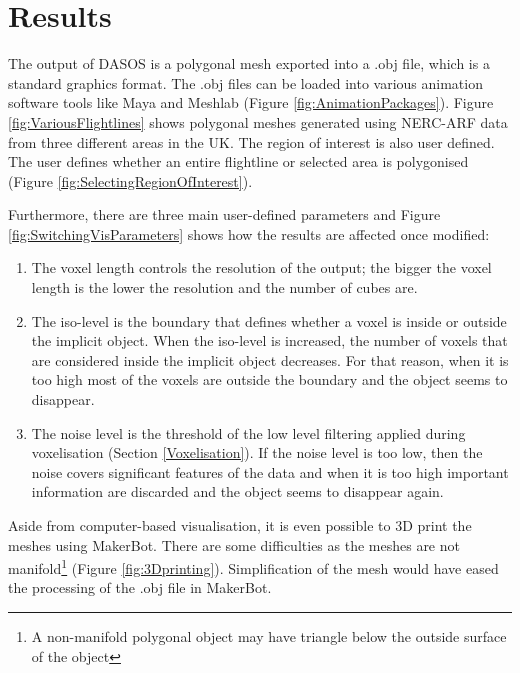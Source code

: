 \documentclass{subfiles}
\begin{document}
\section{Results}\label{sec:MCResults}

\par The output of DASOS is a polygonal mesh exported into a .obj file, which is a standard graphics format. The .obj files can be loaded into various animation software tools like Maya and Meshlab (Figure \ref{fig:AnimationPackages}). Figure \ref{fig:VariousFlightlines} shows polygonal meshes generated using NERC-ARF data from three different areas in the UK.  The region of interest is also user defined. The user defines whether an entire flightline or selected area is polygonised (Figure \ref{fig:SelectingRegionOfInterest}). 

\par Furthermore, there are three main user-defined parameters and Figure \ref{fig:SwitchingVisParameters} shows how the results are affected once modified:
\begin{enumerate}
	\item The voxel length controls the resolution of the output; the bigger the voxel length is the lower the resolution and the number of cubes are.
	\item The iso-level is the boundary that defines whether a voxel is inside or outside the implicit object. When the iso-level is increased, the number of voxels that are considered inside the implicit object decreases. For that reason, when it is too high most of the voxels are outside the boundary and the object seems to disappear.
	\item The noise level is the threshold of the low level filtering applied during voxelisation (Section \ref{Voxelisation}). If the noise level is too low, then the noise covers significant features of the data and when it is too high important information are discarded and the object seems to disappear again.
\end{enumerate}

 
\par Aside from computer-based visualisation, it is even possible to 3D print the meshes using MakerBot.  There are some difficulties as the meshes are not manifold\footnote{ A non-manifold polygonal object may have triangle below the outside surface of the object} (Figure \ref{fig:3Dprinting}). Simplification of the mesh would have eased the processing of the .obj file in MakerBot. 
 
\end{document}
